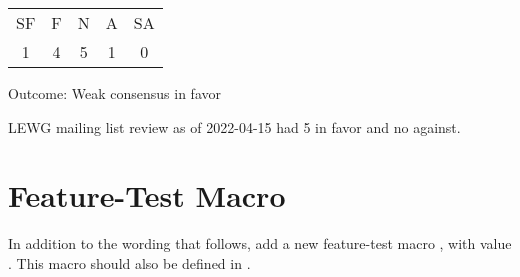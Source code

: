 \documentclass[ebook,10pt,oneside,openany,final]{memoir}
\begin{document}
\begin{tabular}{ c c c c c }
  SF & F & N & A & SA \\
  1 & 4 & 5 & 1 & 0 \\
\end{tabular}

Outcome: Weak consensus in favor

LEWG mailing list review as of 2022-04-15 had 5 in favor and no against.

\section{Feature-Test Macro}

In addition to the wording that follows, add a new feature-test macro
, with value .  This macro should also be
defined in .

\newcommand{\indexhdr}[1]{}
\newcommand{\indexlibrarymember}[2]{
}




\end{document}
